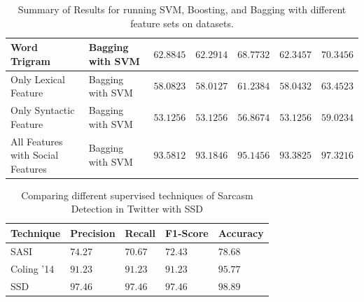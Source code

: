 \begin{table}[htb]
{\begin{tabular}{|@{~}l@{~~}|@{~~}l@{~}|@{~~}l@{~}|@{~~}l@{~}|@{~~}l@{~}|@{~~}l@{~}|@{~~}l@{~}|}
Word Trigram & Bagging with SVM & $62.8845$ & $62.2914$ & $68.7732$ & $62.3457$ & $70.3456$ \\\hline
Only Lexical Feature & Bagging with SVM  & $58.0823$ & $58.0127$ & $61.2384$ & $58.0432$  & $63.4523$  \\\hline
Only Syntactic Feature & Bagging with SVM  & $53.1256$ & $53.1256$ & $56.8674$ & $53.1256$  & $59.0234$ \\\hline
All Features with Social Features & Bagging with SVM & $\mathbf{93.5812}$ & $\mathbf{93.1846}$ & $\mathbf{95.1456}$ & $\mathbf{93.3825}$  & $\mathbf{97.3216}$ \\\hline
\end{tabular}
  }
 \vspace{0.1in}
  \caption{Summary of Results for running SVM, Boosting, and Bagging with different feature sets on datasets.}
  \label{tab:data1}
\end{table}

\begin{table}[htb]
  \centering
  {\small
  \begin{tabular}{|@{~}l@{~~}|@{~~}l@{~}|@{~~}l@{~}|@{~~}l@{~}|@{~~}l@{~}|}
\hline
Technique & Precision & Recall & F1-Score & Accuracy\\\hline
SASI \cite{davidov10} & $74.27$ & $70.67$ & $72.43$ & $78.68$\\\hline
Coling '14 \cite{tomas14} & $91.23$ & $91.23$ & $91.23$ & $95.77$\\\hline
SSD & $97.46$ & $97.46$ & $97.46$ & $98.89$\\\hline
\end{tabular}
  }
 \vspace{0.05in}
  \caption{Comparing different supervised techniques of Sarcasm Detection in Twitter with SSD}
  \label{tab:data2}
\end{table}

